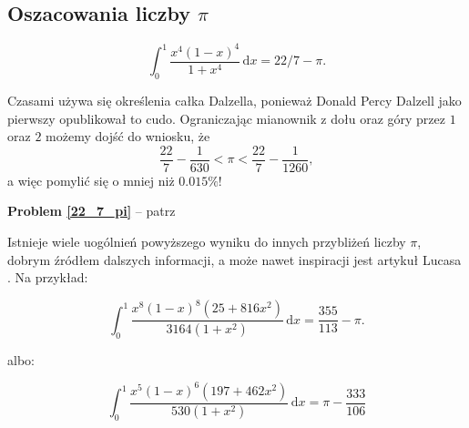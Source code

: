 \subsection{Oszacowania liczby $\pi$}
\begin{problem}
\label{22_7_pi}%
\begin{equation}
    \int_0^1 \frac{x^4(1-x)^4}{1 + x^4} \,\mathrm{d}x = 22/7 - \pi.
\end{equation}
\end{problem}

Czasami używa się określenia całka Dalzella, ponieważ Donald Percy Dalzell \cite{dalzell44} jako pierwszy opublikował to cudo.
Ograniczając mianownik z dołu oraz góry przez $1$ oraz $2$ możemy dojść do wniosku, że
\begin{equation}
    \frac{22}{7} - \frac {1}{630} < \pi < \frac{22}{7} - \frac{1}{1260},
\end{equation}
a więc pomylić się o mniej niż $0.015\%$!

\textbf{Problem \ref{22_7_pi}} -- patrz \cite[s. 24]{nahin15}

Istnieje wiele uogólnień powyższego wyniku do innych przybliżeń liczby $\pi$, dobrym źródłem dalszych informacji, a może nawet inspiracji jest artykuł Lucasa \cite{lucas05}.
Na przykład:

\begin{problem}
\begin{equation}
    \int_0^1 \frac {x^8(1-x)^8 (25+816x^2)}{3164 (1+x^2)} \,\mathrm{d} x = \frac {355}{113} - \pi.
\end{equation}
\end{problem}

albo:

\begin{problem}
\begin{equation}
    \int_0^1 \frac{x^5 ( 1-x)^6 (197 + 462 x^2)}{530 (1+x^2)} \,\mathrm{d}x = \pi - \frac{333}{106}
\end{equation}
\end{problem}